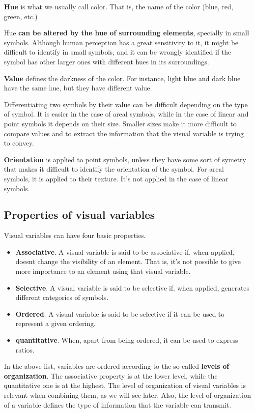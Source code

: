 \textbf{Hue} is what we usually call color. That is, the name of the color (blue, red, green, etc.)

Hue \textbf{can be altered by the hue of surrounding elements}, specially in small symbols. Although human perception has a great sensitivity to it, it might be difficult to identify in small symbols, and it can be wrongly identified if the symbol has other larger ones with different hues in its surroundings.

\textbf{Value} defines the darkness of the color. For instance, light blue and dark blue have the same hue, but they have different value.

Differentiating two symbols by their value can be difficult depending on the type of symbol. It is easier in the case of areal symbols, while in the case of linear and point symbols it depends on their size. Smaller sizes make it more difficult to compare values and to extract the information that the visual variable is trying to convey.

\textbf{Orientation} is applied to point symbols, unless they have some sort of symetry that makes it difficult to identify the orientation of the symbol. For areal symbols, it is applied to their texture. It's not applied in the case of linear symbols.

\subsection{Properties of visual variables}

Visual variables can have four basic properties.

\begin{itemize}
	\item \textbf{Associative}. A visual variable is said to be associative if, when applied, doesnt change the visibility of an element. That is, it's not possible to give more importance to an element using that visual variable. 
	\item \textbf{Selective}. A visual variable is said to be selective if, when applied, generates different categories of symbols.
	\item \textbf{Ordered}. A visual variable is said to be selective if it can be used to represent a given ordering.
	\item \textbf{quantitative}. When, apart from being ordered, it can be used to express ratios.
\end{itemize}

In the above list, variables are ordered according to the so-called \textbf{levels of organization}. The associative property is at the lower level, while the quantitative one is at the highest. The level of organization of visual variables is relevant when combining them, as we will see later. Also, the level of organization of a variable defines the type of information that the variable can transmit.

